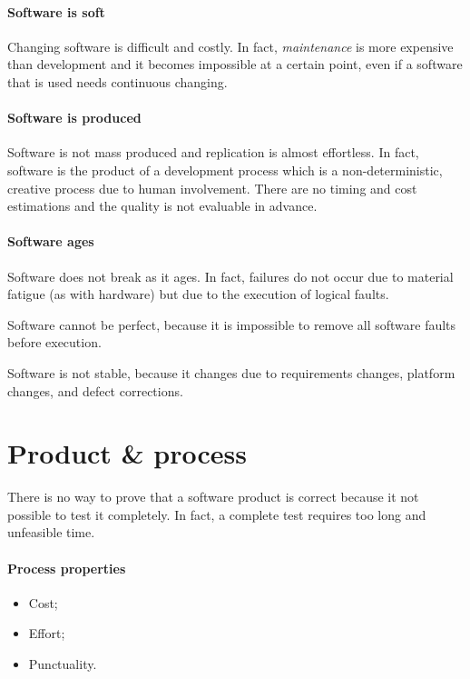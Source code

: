 \paragraph{Software is soft} Changing software is difficult and costly. In fact, \emph{maintenance} is more expensive than development and it becomes impossible at a certain point, even if a software that is used needs continuous changing.

\paragraph{Software is produced} Software is not mass produced and replication is almost effortless. In fact, software is the product of a development process which is a non-deterministic, creative process due to human involvement. There are no timing and cost estimations and the quality is not evaluable in advance.

\paragraph{Software ages} Software does not break as it ages. In fact, failures do not occur due to material fatigue (as with hardware) but due to the execution of logical faults.

Software cannot be perfect, because it is impossible to remove all software faults before execution.

Software is not stable, because it changes due to requirements changes, platform changes, and defect corrections.

\section{Product \& process}
There is no way to prove that a software product is correct because it not possible to test it completely. In fact, a complete test requires too long and unfeasible time.

\paragraph{Process properties}
\begin{itemize}
\item Cost;
\item Effort;
\item Punctuality.
\end{itemize}

